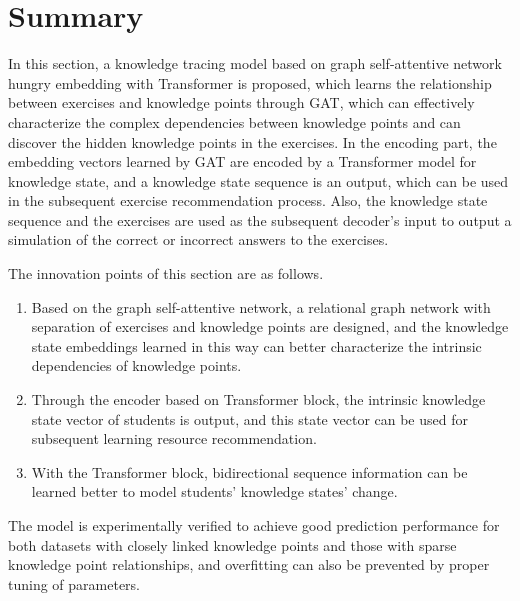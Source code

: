 \section{Summary}
%
In this section, a knowledge tracing model based on graph self-attentive network hungry embedding with Transformer is proposed, which learns the relationship between exercises and knowledge points through GAT, which can effectively characterize the complex dependencies between knowledge points and can discover the hidden knowledge points in the exercises. In the encoding part, the embedding vectors learned by GAT are encoded by a Transformer model for knowledge state, and a knowledge state sequence is an output, which can be used in the subsequent exercise recommendation process. Also, the knowledge state sequence and the exercises are used as the subsequent decoder's input to output a simulation of the correct or incorrect answers to the exercises.

The innovation points of this section are as follows.
\begin{enumerate}
    \item Based on the graph self-attentive network, a relational graph network with separation of exercises and knowledge points are designed, and the knowledge state embeddings learned in this way can better characterize the intrinsic dependencies of knowledge points.
    \item Through the encoder based on Transformer block, the intrinsic knowledge state vector of students is output, and this state vector can be used for subsequent learning resource recommendation.
    \item With the Transformer block, bidirectional sequence information can be learned better to model students' knowledge states' change.
\end{enumerate}

The model is experimentally verified to achieve good prediction performance for both datasets with closely linked knowledge points and those with sparse knowledge point relationships, and overfitting can also be prevented by proper tuning of parameters.